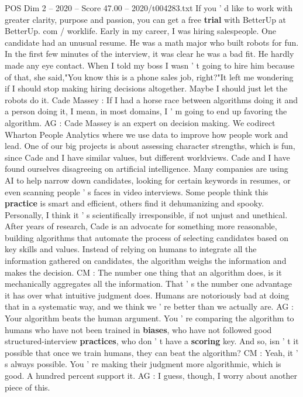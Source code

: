 \begin{textsample}{POS Dim 2 – 2020 – Score 47.00 – 2020/t004283.txt}
If you ' d like to work with greater clarity, purpose and passion, you can get a free \textbf{trial} with BetterUp at BetterUp. com / worklife.
Early in my career, I was hiring salespeople.
One candidate had an unusual resume.
He was a math major who built robots for fun.
In the first few minutes of the interview, it was clear he was a bad fit.
He hardly made any eye contact.
When I told my boss I wasn ' t going to hire him because of that, she said,"You know this is a phone sales job, right?"It left me wondering if I should stop making hiring decisions altogether.
Maybe I should just let the robots do it.
Cade Massey : If I had a horse race between algorithms doing it and a person doing it, I mean, in most domains, I ' m going to end up favoring the algorithm.
AG : Cade Massey is an expert on decision making.
We codirect Wharton People Analytics where we use data to improve how people work and lead.
One of our big projects is about assessing character strengths, which is fun, since Cade and I have similar values, but different worldviews.
Cade and I have found ourselves disagreeing on artificial intelligence.
Many companies are using AI to help narrow down candidates, looking for certain keywords in resumes, or even scanning people ' s faces in video interviews.
Some people think this \textbf{practice} is smart and efficient, others find it dehumanizing and spooky.
Personally, I think it ' s scientifically irresponsible, if not unjust and unethical.
After years of research, Cade is an advocate for something more reasonable, building algorithms that automate the process of selecting candidates based on key skills and values.
Instead of relying on humans to integrate all the information gathered on candidates, the algorithm weighs the information and makes the decision.
CM : The number one thing that an algorithm does, is it mechanically aggregates all the information.
That ' s the number one advantage it has over what intuitive judgment does.
Humans are notoriously bad at doing that in a systematic way, and we think we ' re better than we actually are.
AG : Your algorithm beats the human argument.
You ' re comparing the algorithm to humans who have not been trained in \textbf{biases}, who have not followed good structured-interview \textbf{practices}, who don ' t have a \textbf{scoring} key.
And so, isn ' t it possible that once we train humans, they can beat the algorithm?
CM : Yeah, it ' s always possible.
You ' re making their judgment more algorithmic, which is good.
A hundred percent support it.
AG : I guess, though, I worry about another piece of this.

\end{textsample}
